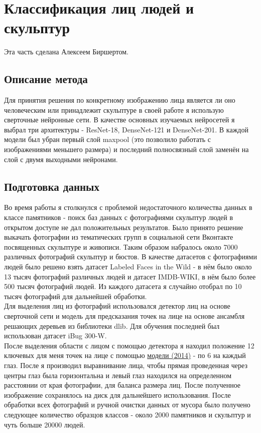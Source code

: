 \documentclass[a4paper,14pt]{extarticle}
\newcommand{\bibref}[3]{\hyperlink{#1}{#2 (#3)}} %
\begin{document}
    \section{Классификация лиц людей и скульптур}
    Эта часть сделана Алексеем Биршертом.
    \subsection{Описание метода}
    Для принятия решения по конкретному изображению лица является ли оно человеческим или принадлежит скульптуре в своей работе я использую сверточные нейронные сети. В качестве основных изучаемых нейросетей я выбрал три архитектуры - ResNet-18, DenseNet-121 и DenseNet-201. В каждой модели был убран первый слой maxpool (это позволило работать с изображениями меньшего размера) и последний полносвязный слой заменён на слой с двумя выходными нейронами.

    \subsection{Подготовка данных}
    Во время работы я столкнулся с проблемой недостаточного количества данных в классе памятников - поиск баз данных с фотографиями скульптур людей в открытом доступе не дал положительных результатов. Было принято решение выкачать фотографии из тематических групп в социальной сети Вконтакте посвященных скульптуре и живописи. Таким образом набралось около 7000 различных фотографий скульптур и бюстов. В качестве датасетов с фотографиями людей было решено взять датасет Labeled Faces in the Wild - в нём было около 13 тысяч фотографий различных людей и датасет IMDB-WIKI, в нём было более 500 тысяч фотографий людей. Из каждого датасета я случайно отобрал по 10 тысяч фотографий для дальнейшей обработки. \\
    Для выделения лиц из фотографий использовался детектор лиц на основе сверточной сети и модель для предсказания точек на лице на основе ансамбля решающих деревьев из библиотеки dlib. Для обучения последней был использован датасет iBug 300-W. \\
    После выделения области с лицом с помощью детектора я находил положение 12 ключевых для меня точек на лице с помощью \bibref{align}{модели}{2014} - по 6 на каждый глаз. После я производил выравнивание лица, чтобы прямая проведенная через центры глаз была горизонтальна и левый глаз находился на определенном расстоянии от края фотографии, для баланса размера лиц. После полученное изображение сохранялось на диск для дальнейшего использования. После обработки всех фотографий и ручной очистки данных от мусора было получено следующее количество образцов классов - около 2000 памятников и скульптур и чуть больше 20000 людей.
\end{document}

